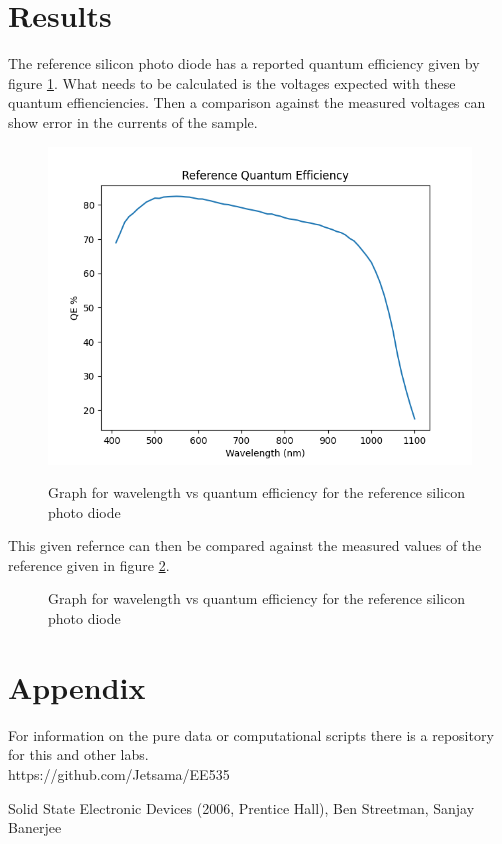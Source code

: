 \documentclass[10pt,a4paper]{article}
\begin{document}
\begin{multicols}{2}
\section*{Results}
The reference silicon photo diode has a reported quantum efficiency given by figure \ref{refQE}. What needs to be calculated is the voltages 
expected with these quantum effienciencies. Then a comparison against the measured voltages can show error in the currents of the sample.
\begin{figure}[H]\centering\label{refQE}
\includegraphics[scale=0.5]{ReferenceQE}
\caption{Graph for wavelength vs quantum efficiency for the reference silicon photo diode}
\end{figure}
This given refernce can then be compared against the measured values of the reference given in figure \ref{refQEMeas}.
\begin{figure}[H]\centering\label{refQEMeas}
\caption{Graph for wavelength vs quantum efficiency for the reference silicon photo diode}
\end{figure}


\section*{Appendix}
For information on the pure data or computational scripts there is a repository for this and other labs. \\
https://github.com/Jetsama/EE535\\
\begin{thebibliography}{9}
 Solid State Electronic Devices (2006, Prentice Hall), Ben Streetman, Sanjay Banerjee
 

\end{thebibliography}
\end{multicols}
\end{document}
